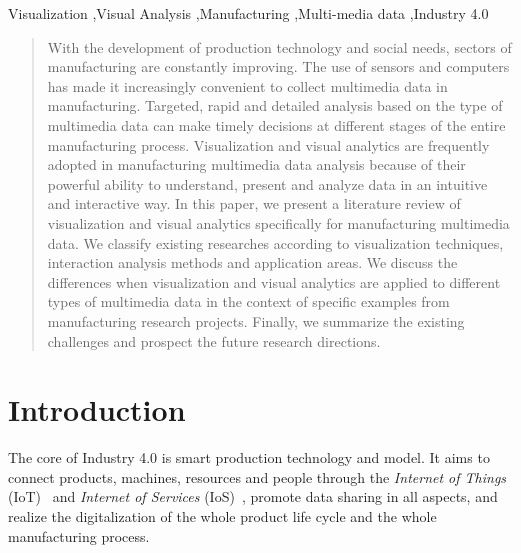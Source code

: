\documentclass[a4paper,fleqn]{cas-dc}
\begin{document}
	
	\begin{keywords}
		Visualization \sep Visual Analysis \sep Manufacturing \sep Multi-media data \sep Industry 4.0
	\end{keywords}
	
	
	\begin{abstract}
		With the development of production technology and social needs, sectors of manufacturing are constantly improving. The use of sensors and computers has made it increasingly convenient to collect multimedia data in manufacturing. Targeted, rapid and detailed analysis based on the type of multimedia data can make timely decisions at different stages of the entire manufacturing process. Visualization and visual analytics are frequently adopted in manufacturing multimedia data analysis because of their powerful ability to understand, present and analyze data in an intuitive and interactive way. In this paper, we present a literature review of visualization and visual analytics specifically for manufacturing multimedia data. We classify existing researches according to visualization techniques, interaction analysis methods and application areas. We discuss the differences when visualization and visual analytics are applied to different types of multimedia data in the context of specific examples from manufacturing research projects. Finally, we summarize the existing challenges and prospect the future research directions.
	\end{abstract}
	
	\maketitle
	


\section{Introduction}
The core of Industry 4.0 is smart production technology and model. It aims to connect products, machines, resources and people through the \textit{Internet of Things} (IoT)~\cite{Gubbi2013} and \textit{Internet of Services} (IoS)~\cite{Cardoso2010}, promote data sharing in all aspects, and realize the digitalization of the whole product life cycle and the whole manufacturing process.
\end{document}
